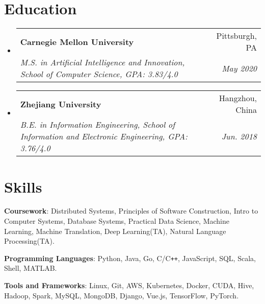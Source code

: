 \documentclass[letterpaper,11pt]{article}
\makeatletter
\newcommand{\resumeItem}[2]{
  \small{
    \textbf{#1}{: #2 \vspace{3pt}}
  }
}
\newcommand{\resumeSubheading}[4]{
  \vspace{-1pt}\item[]
    \begin{tabular*}{0.97\textwidth}{l@{\extracolsep{\fill}}r}
      \textbf{#1} & #2 \\
      \textit{\small#3} & \textit{\small #4} \\
    \end{tabular*}\vspace{-8pt}
}
\newcommand{\resumeSubItem}[2]{\resumeItem{#1}{#2}\vspace{-3pt}}
\newcommand{\resumeSubHeadingListStart}{\begin{itemize}[leftmargin=0.1em]}
\newcommand{\resumeSubHeadingListEnd}{\end{itemize}}
\newcommand{\skillSectionStart}{\begin{itemize}[leftmargin=0pt]\vspace{-5pt}}
\newcommand{\skillSectionEnd}{\end{itemize}\vspace{-14pt}}
\makeatother
\begin{document}


 \\
\vspace{3.5pt}
\\


\vspace{-10pt}
\section{Education}
  \resumeSubHeadingListStart
    \resumeSubheading
      {Carnegie Mellon University}{Pittsburgh, PA}
      {M.S. in Artificial Intelligence and Innovation, School of Computer Science, GPA: 3.83/4.0}{May 2020}
    \vspace{0.5pt}
    \resumeSubheading
      {Zhejiang University}{Hangzhou, China}
      {B.E. in Information Engineering, School of Information and Electronic Engineering, GPA: 3.76/4.0}{Jun. 2018}
  \resumeSubHeadingListEnd
  

\section{Skills}
\skillSectionStart
        \resumeSubItem{Coursework}
        {Distributed Systems, Principles of Software Construction, Intro to Computer Systems, Database Systems, Practical Data Science, Machine Learning, Machine Translation, Deep Learning(TA), Natural Language Processing(TA).}
        \newline
		\resumeSubItem{Programming Languages}
		{Python, Java, Go, C/C\texttt{++}, JavaScript, SQL, Scala, Shell, MATLAB.}
		\newline
		\resumeSubItem{Tools and Frameworks}
		{Linux, Git, AWS, Kubernetes, Docker, CUDA, Hive, Hadoop, Spark, MySQL, MongoDB, Django, Vue.js, TensorFlow, PyTorch.}
\skillSectionEnd


\end{document}
